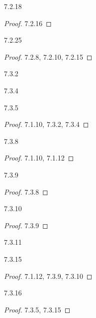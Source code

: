 \documentclass[a4paper,12pt]{scrartcl}
\begin{document}
\begin{cor}
  7.2.18
\end{cor}
\begin{proof}
  7.2.16
\end{proof}

\begin{cor}
  7.2.25
\end{cor}
\begin{proof}
  7.2.8, 7.2.10, 7.2.15
\end{proof}

\begin{cor}
  7.3.2
\end{cor}

\begin{cor}
  7.3.4
\end{cor}

\begin{cor}
  7.3.5
\end{cor}
\begin{proof}
  7.1.10, 7.3.2, 7.3.4
\end{proof}

\begin{cor}
  7.3.8
\end{cor}
\begin{proof}
  7.1.10, 7.1.12
\end{proof}

\begin{cor}
  7.3.9
\end{cor}
\begin{proof}
  7.3.8
\end{proof}

\begin{cor}
  7.3.10
\end{cor}
\begin{proof}
  7.3.9
\end{proof}

\begin{prop}
  7.3.11
\end{prop}

\begin{cor}
  7.3.15
\end{cor}
\begin{proof}
  7.1.12, 7.3.9, 7.3.10
\end{proof}

\begin{cor}
  7.3.16
\end{cor}
\begin{proof}
  7.3.5, 7.3.15
\end{proof}
\end{document}
